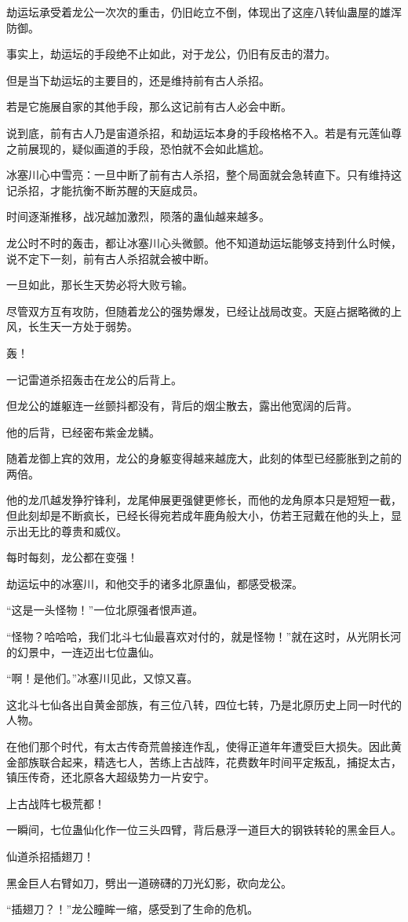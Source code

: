 \begin{this_body}
劫运坛承受着龙公一次次的重击，仍旧屹立不倒，体现出了这座八转仙蛊屋的雄浑防御。

事实上，劫运坛的手段绝不止如此，对于龙公，仍旧有反击的潜力。

但是当下劫运坛的主要目的，还是维持前有古人杀招。

若是它施展自家的其他手段，那么这记前有古人必会中断。

说到底，前有古人乃是宙道杀招，和劫运坛本身的手段格格不入。若是有元莲仙尊之前展现的，疑似画道的手段，恐怕就不会如此尴尬。

冰塞川心中雪亮：一旦中断了前有古人杀招，整个局面就会急转直下。只有维持这记杀招，才能抗衡不断苏醒的天庭成员。

时间逐渐推移，战况越加激烈，陨落的蛊仙越来越多。

龙公时不时的轰击，都让冰塞川心头微颤。他不知道劫运坛能够支持到什么时候，说不定下一刻，前有古人杀招就会被中断。

一旦如此，那长生天势必将大败亏输。

尽管双方互有攻防，但随着龙公的强势爆发，已经让战局改变。天庭占据略微的上风，长生天一方处于弱势。

轰！

一记雷道杀招轰击在龙公的后背上。

但龙公的雄躯连一丝颤抖都没有，背后的烟尘散去，露出他宽阔的后背。

他的后背，已经密布紫金龙鳞。

随着龙御上宾的效用，龙公的身躯变得越来越庞大，此刻的体型已经膨胀到之前的两倍。

他的龙爪越发狰狞锋利，龙尾伸展更强健更修长，而他的龙角原本只是短短一截，但此刻却是不断疯长，已经长得宛若成年鹿角般大小，仿若王冠戴在他的头上，显示出无比的尊贵和威仪。

每时每刻，龙公都在变强！

劫运坛中的冰塞川，和他交手的诸多北原蛊仙，都感受极深。

“这是一头怪物！”一位北原强者恨声道。

“怪物？哈哈哈，我们北斗七仙最喜欢对付的，就是怪物！”就在这时，从光阴长河的幻景中，一连迈出七位蛊仙。

“啊！是他们。”冰塞川见此，又惊又喜。

这北斗七仙各出自黄金部族，有三位八转，四位七转，乃是北原历史上同一时代的人物。

在他们那个时代，有太古传奇荒兽接连作乱，使得正道年年遭受巨大损失。因此黄金部族联合起来，精选七人，苦练上古战阵，花费数年时间平定叛乱，捕捉太古，镇压传奇，还北原各大超级势力一片安宁。

上古战阵七极荒都！

一瞬间，七位蛊仙化作一位三头四臂，背后悬浮一道巨大的钢铁转轮的黑金巨人。

仙道杀招插翅刀！

黑金巨人右臂如刀，劈出一道磅礴的刀光幻影，砍向龙公。

“插翅刀？！”龙公瞳眸一缩，感受到了生命的危机。

\end{this_body}

